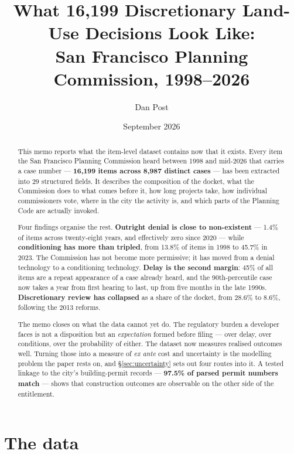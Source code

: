 \documentclass[11pt]{article}
\title{What 16{,}199 Discretionary Land-Use Decisions Look Like:\\
\large San Francisco Planning Commission, 1998--2026}
\author{Dan Post}
\date{September 2026}
\begin{document}
\maketitle

\begin{abstract}
\noindent
This memo reports what the item-level dataset contains now that it exists. Every item the San
Francisco Planning Commission heard between 1998 and mid-2026 that carries a case number ---
\textbf{16{,}199 items across 8{,}987 distinct cases} --- has been extracted into 29 structured
fields. It describes the composition of the docket, what the Commission does to what comes
before it, how long projects take, how individual commissioners vote, where in the city the
activity is, and which parts of the Planning Code are actually invoked.

\medskip\noindent
Four findings organise the rest. \textbf{Outright denial is close to non-existent} --- 1.4\%
of items across twenty-eight years, and effectively zero since 2020 --- while
\textbf{conditioning has more than tripled}, from 13.8\% of items in 1998 to 45.7\% in 2023.
The Commission has not become more permissive; it has moved from a denial technology to a
conditioning technology. \textbf{Delay is the second margin}: 45\% of all items are a repeat
appearance of a case already heard, and the 90th-percentile case now takes a year from first
hearing to last, up from five months in the late 1990s. \textbf{Discretionary review has
collapsed} as a share of the docket, from 28.6\% to 8.6\%, following the 2013 reforms.

\medskip\noindent
The memo closes on what the data cannot yet do. The regulatory burden a developer faces is
not a disposition but an \emph{expectation} formed before filing --- over delay, over
conditions, over the probability of either. The dataset now measures realised outcomes well.
Turning those into a measure of \emph{ex ante} cost and uncertainty is the modelling problem
the paper rests on, and \S\ref{sec:uncertainty} sets out four routes into it. A tested
linkage to the city's building-permit records --- \textbf{97.5\% of parsed permit numbers
match} --- shows that construction outcomes are observable on the other side of the
entitlement.
\end{abstract}

\tableofcontents
\newpage

\section{The data}
\end{document}
